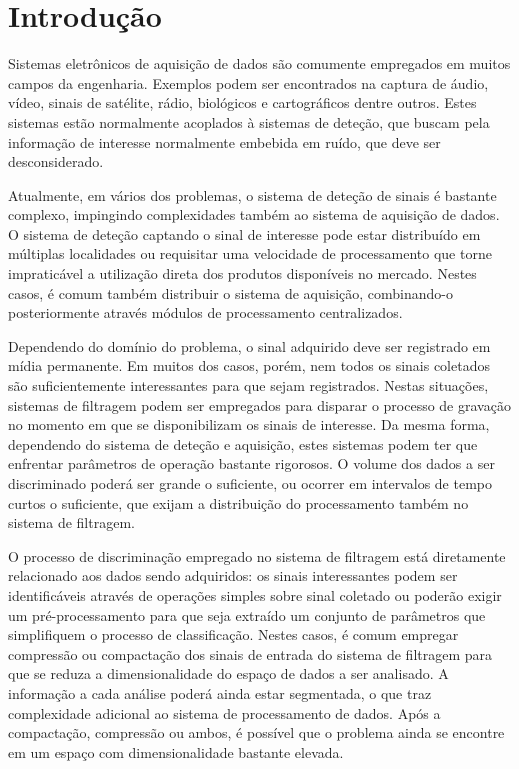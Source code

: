 \typeout{ ====================================================================}
\typeout{ ====================================================================}

\chapter{Introdução}

Sistemas eletrônicos de aquisição de dados são comumente empregados em muitos
campos da engenharia. Exemplos podem ser encontrados na captura de áudio,
vídeo, sinais de satélite, rádio, biológicos e cartográficos dentre
outros. Estes sistemas estão normalmente acoplados à sistemas de deteção, que
buscam pela informação de interesse normalmente embebida em ruído, que deve
ser desconsiderado.

Atualmente, em vários dos problemas, o sistema de deteção de sinais é bastante
complexo, impingindo complexidades também ao sistema de aquisição de dados. O
sistema de deteção captando o sinal de interesse pode estar distribuído em
múltiplas localidades ou requisitar uma velocidade de processamento que torne
impraticável a utilização direta dos produtos disponíveis no mercado. Nestes
casos, é comum também distribuir o sistema de aquisição, combinando-o
posteriormente através módulos de processamento centralizados.

Dependendo do domínio do problema, o sinal adquirido deve ser registrado em
mídia permanente. Em muitos dos casos, porém, nem todos os sinais coletados
são suficientemente interessantes para que sejam registrados. Nestas
situações, sistemas de filtragem  podem ser empregados para
disparar o processo de gravação no momento em que se disponibilizam os sinais
de interesse. Da mesma forma, dependendo do sistema de deteção e aquisição,
estes sistemas podem ter que enfrentar parâmetros de operação bastante
rigorosos. O volume dos dados a ser discriminado poderá ser grande o
suficiente, ou ocorrer em intervalos de tempo curtos o suficiente, que exijam
a distribuição do processamento também no sistema de filtragem.

O processo de discriminação empregado no sistema de filtragem está diretamente
relacionado aos dados sendo adquiridos: os sinais interessantes podem ser
identificáveis através de operações simples sobre sinal coletado ou poderão
exigir um pré-processamento para que seja extraído um conjunto de parâmetros
que simplifiquem o processo de classificação. Nestes casos, é comum empregar
compressão ou compactação dos sinais de entrada do sistema de filtragem para
que se reduza a dimensionalidade do espaço de dados a ser analisado. A
informação a cada análise poderá ainda estar segmentada, o que traz
complexidade adicional ao sistema de processamento de dados. Após a
compactação, compressão ou ambos, é possível que o problema ainda se encontre
em um espaço com dimensionalidade bastante elevada. 

